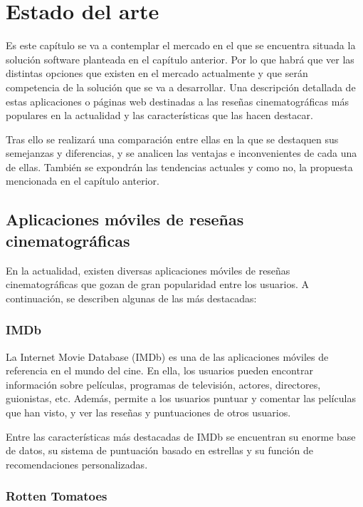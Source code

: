 \chapter{Estado del arte}

Es este capítulo se va a contemplar el mercado en el que se encuentra situada la solución software planteada en el capítulo anterior. Por lo que habrá que ver las distintas opciones que existen en el mercado actualmente y que serán competencia de la solución que se va a desarrollar. Una descripción detallada de estas aplicaciones o páginas web destinadas a las reseñas cinematográficas más populares en la actualidad y las características que las hacen destacar.

Tras ello se realizará una comparación entre ellas en la que se destaquen sus semejanzas y diferencias, y se analicen las ventajas e inconvenientes de cada una de ellas. También se expondrán las tendencias actuales y como no, la propuesta mencionada en el capítulo anterior.

\section{Aplicaciones móviles de reseñas cinematográficas}

En la actualidad, existen diversas aplicaciones móviles de reseñas cinematográficas que gozan de gran popularidad entre los usuarios. A continuación, se describen algunas de las más destacadas:

\subsection{IMDb}

La Internet Movie Database (IMDb) es una de las aplicaciones móviles de referencia en el mundo del cine. En ella, los usuarios pueden encontrar información sobre películas, programas de televisión, actores, directores, guionistas, etc. Además, permite a los usuarios puntuar y comentar las películas que han visto, y ver las reseñas y puntuaciones de otros usuarios.

Entre las características más destacadas de IMDb se encuentran su enorme base de datos, su sistema de puntuación basado en estrellas y su función de recomendaciones personalizadas.

\subsection{Rotten Tomatoes}

